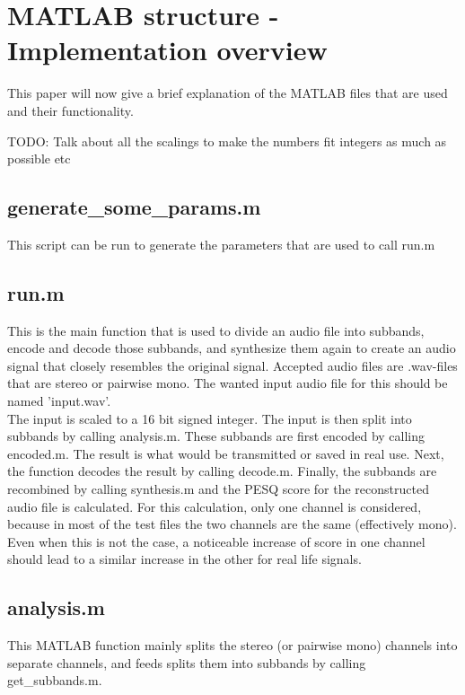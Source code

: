 \documentclass[a4paper]{article}
\begin{document}
\section{MATLAB structure - Implementation overview}
This paper will now give a brief explanation of the MATLAB files that are used and their functionality.

TODO: Talk about all the scalings to make the numbers fit integers as much as possible etc

\subsection{generate\_some\_params.m}
This script can be run to generate the parameters that are used to call run.m

\subsection{run.m}
This is the main function that is used to divide an audio file into subbands, encode and decode those subbands, and synthesize them again to create an audio signal that closely resembles the original signal. Accepted audio files are .wav-files that are stereo or pairwise mono. The wanted input audio file for this should be named 'input.wav'.
\\
The input is scaled to a 16 bit signed integer. The input is then split into subbands by calling analysis.m. These subbands are first encoded by calling encoded.m. The result is what would be transmitted or saved in real use. Next, the function decodes the result by calling decode.m. Finally, the subbands are recombined by calling synthesis.m and the PESQ score for the reconstructed audio file is calculated. For this calculation, only one channel is considered, because in most of the test files the two channels are the same (effectively mono). Even when this is not the case, a noticeable increase of score in one channel should lead to a similar increase in the other for real life signals.

\subsection{analysis.m}
This MATLAB function mainly splits the stereo (or pairwise mono) channels into separate channels, and feeds splits them into subbands by calling get\_subbands.m.
\end{document}

